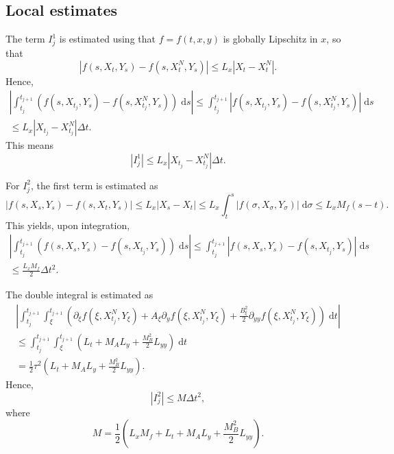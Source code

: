 \documentclass[reqno,12pt]{amsart}
\theoremstyle{plain}%
\theoremstyle{definition}
\begin{document}
\subsection{Local estimates}

The term $I_j^1$ is estimated using that $f=f(t, x, y)$ is globally Lipschitz in $x$, so that
$$
\left| f(s, X_t, Y_s) - f(s, X_t^N, Y_s) \right| \leq L_x |X_t - X_t^N|.
$$
Hence,
\begin{multline*}
\left|  \int_{t_j}^{t_{j+1}} \left( f(s, X_{t_j}, Y_s) - f(s, X_{t_j}^N, Y_s)  \right) \;\mathrm{d}s \right| \leq   \int_{t_j}^{t_{j+1}} \left| f(s, X_{t_j}, Y_s) - f(s, X_{t_j}^N, Y_s)  \right| \;\mathrm{d} s \\ \leq L_x |X_{t_j} - X_{t_j}^N| \Delta t.
\end{multline*}
This means
\begin{equation}
\label{I1estimate}
\left| I_j^1 \right| \leq L_x |X_{t_j} - X_{t_j}^N| \Delta t.
\end{equation}

For $I_j^2$, the first term is estimated as
$$
\left| f(s, X_s, Y_s) - f(s, X_t, Y_s) \right| \leq L_x |X_s - X_t| \leq L_x \int_t^s |f(\sigma, X_\sigma, Y_\sigma)| \;\mathrm{d}\sigma \leq L_x M_f (s - t).
$$
This yields, upon integration,
\begin{multline*}
\left|  \int_{t_j}^{t_{j+1}} \left(f(s, X_s, Y_s) - f(s, X_{t_j}, Y_s) \right) \;\mathrm{d}s \right| \leq  \int_{t_j}^{t_{j+1}} \left| f(s, X_s, Y_s) - f(s, X_{t_j}, Y_s) \right| \;\mathrm{d} s \\
\leq \frac{L_x M_f}{2} \Delta t^2.
\end{multline*}

The double integral is estimated as
\begin{multline}
   \left|  \int_{t_j}^{t_{j+1}}  \int_\xi^{t_{j+1}} \left(\partial_\xi f(\xi, X_{t_j}^N, Y_\xi) + A_\xi \partial_y f(\xi, X_{t_j}^N, Y_\xi)  + \frac{B_\xi^2}{2}\partial_{yy}f(\xi, X_{t_j}^N, Y_\xi) \right) \;\mathrm{d}t \right| \\
   \leq \int_{t_j}^{t_{j+1}}  \int_\xi^{t_{j+1}} \left(L_t + M_A L_y  + \frac{M_B^2}{2}L_{yy} \right) \;\mathrm{d}t \\
   = \frac{1}{2}\tau^2\left(L_t + M_A L_y  + \frac{M_B^2}{2}L_{yy} \right).
\end{multline}
Hence,
\begin{equation}
\label{I2estimate}
\left| I_j^2 \right| \leq M\Delta t^2,
\end{equation}
where
$$
M = \frac{1}{2}\left(L_x M_f + L_t + M_A L_y  + \frac{M_B^2}{2}L_{yy} \right).
$$
\end{document}
